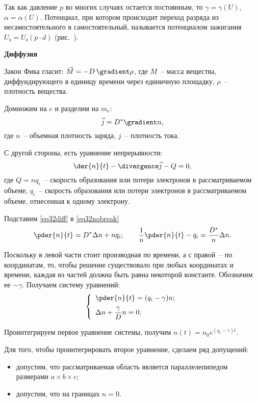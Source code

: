 Так как давление \( p \) во многих случаях остается постоянным, то
\( \gamma = \gamma(U) \), \( \alpha = \alpha(U) \). Потенциал, при котором
происходит переход разряда из несамостоятельного в самостоятельный, называется
потенциалом зажигания \( U_\text{з} = U_\text{з}(p \cdot d) \) (рис.~).


\hspace{1em}\textbf{Диффузия}

Закон Фика гласит: \( \vec{M} = -D\,\gradient\rho \), где \( M \)~-- масса
вещества, диффундирующего в единицу времени через единичную площадку,
\( \rho \)~-- плотность вещества.

Домножим на \( e \) и разделим на \( m_e \):
\begin{equation}
  \vec{j} = D^* \gradient n,
  \label{eq32diff}
\end{equation}
где \( n \)~-- объемная плотность заряда, \( j \)~-- плотность тока.

С другой стороны, есть уравнение непрерывности:
\begin{equation}
  \der{n}{t} - \divergence\vec{j} - Q = 0,
  \label{eq32nobreak}
\end{equation}
где \( Q = nq_i \)~-- скорость образования или потери электронов в рассматриваемом
объеме, \( q_i \)~-- скорость образования или потери электронов в рассматриваемом
объеме, отнесенная к одному электрону.

Подставим \eqref{eq32diff} в \eqref{eq32nobreak}
\[
  \pder{n}{t} = D^*\D n + nq_i; \qquad
    \frac{1}{n}\pder{n}{t} - q_i = \frac{D^*}{n}\D n.
\]

Поскольку в левой части стоит производная по времени, а с правой~-- по
координатам, то, чтобы решение существовало при любых координатах и времени,
каждая из частей должна быть равна некоторой константе. Обозначим ее
\( -\gamma \). Получаем систему уравнений:
\[
  \left\{
    \begin{array}{l}
      \displaystyle\pder{n}{t} = (q_i - \gamma)n; \\[.6em]
      \D n + \dfrac{\gamma}{D}n = 0.
    \end{array}
  \right.
\]

Проинтегрируем первое уравнение системы, получим
\(
  n(t) = n_0 e^{(q_i - \gamma)t}
\).

Для того, чтобы проинтегрировать второе уравнение, сделаем ряд допущений:
\begin{itemize}
  \item допустим, что рассматриваемая область является параллелепипедом
    размерами \( a\times b\times c \);
  \item допустим, что на границах \( n = 0 \).
\end{itemize}

